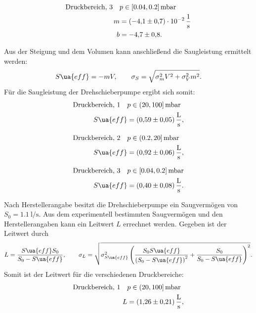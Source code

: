 \begin{align}
  \label{eq: regression_dreh_druck_3}
  \begin{aligned}
  \text{Druckbereich, 3} \quad &p\in[0.04,0.2]\,\si{\milli\bar} \\
  m&=\SI{-4.1\pm0.7 e-2}{\per\second} \\
  b&=\num{-4.7 \pm0.8 }.
\end{aligned}
\end{align}

Aus der Steigung und dem Volumen kann anschließend die Saugleistung ermittelt werden:
\begin{equation}
  \label{eq: saug_druck}
  S\ua{eff}=-mV, \qquad \sigma_{S}=\sqrt{\sigma_{m}^{2} V^{2} + \sigma_{V}^{2} m^{2}}.
\end{equation}
Für die Saugleistung der Drehschieberpumpe ergibt sich somit:
\begin{align}
  \label{eq:dreh_saug_1}
  \begin{aligned}
  \text{Druckbereich, 1} \quad  &p\in(20,100]\,\si{\milli\bar} \\
   S\ua{eff}&=\SI{0.59\pm 0.05}{\litre\per\second},
\end{aligned}
\end{align}

\begin{align}
  \label{eq:dreh_saug_2}
  \begin{aligned}
  \text{Druckbereich, 2} \quad  &p\in(0.2,20]\,\si{\milli\bar} \\
   S\ua{eff}&=\SI{0.92\pm 0.06}{\litre\per\second},
\end{aligned}
\end{align}

\begin{align}
  \label{eq:dreh_saug_3}
  \begin{aligned}
  \text{Druckbereich, 3} \quad &p\in[0.04,0.2]\,\si{\milli\bar} \\
   S\ua{eff}&=\SI{0.40\pm 0.08}{\litre\per\second}.
\end{aligned}
\end{align}

Nach Herstellerangabe besitzt die Drehschieberpumpe ein Saugvermögen von $S_0=\SI{1.1}{\litre\per\second}$.
Aus dem experimentell bestimmten Saugvermögen und den Herstellerangaben kann ein Leitwert $L$ errechnet werden.
Gegeben ist der Leitwert durch
\begin{equation}
  \label{eq: leitwert}
  L=\frac{S\ua{eff} S_0}{S_0-S\ua{eff}}, \qquad \sigma_L=\sqrt{ \sigma_{S\ua{eff}}^{2} \left(\frac{S_{0} S\ua{eff}}{\left(S_{0} - S\ua{eff}\right)^{2}} + \frac{S_{0}}{S_{0} - S\ua{eff}}\right)^{2}}.
\end{equation}
Somit ist der Leitwert für die verschiedenen Druckbereiche:
\begin{align}
  \label{eq:dreh_leit_1}
  \begin{aligned}
  \text{Druckbereich, 1} \quad  &p\in(20,100]\,\si{\milli\bar} \\
   L&=\SI{1.26\pm 0.21}{\litre\per\second},
\end{aligned}
\end{align}

